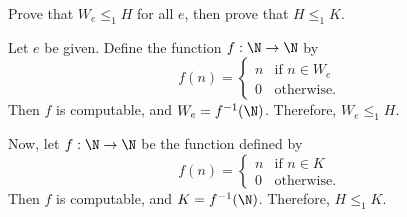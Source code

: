 \begin{problem}
  Prove that $W_e \leq_1 H$ for all $e$,
  then prove that $H \leq_1 K$.

  \begin{answer}
    Let $e$ be given.
    Define the function $f : \N \to \N$ by
    \[
      f(n) = \begin{cases}
        n & \text{if $n \in W_e$} \\
        0 & \text{otherwise}.
      \end{cases}
    \]
    Then $f$ is computable, and $W_e = f^{-1}(\N)$.
    Therefore, $W_e \leq_1 H$.

    Now, let $f : \N \to \N$ be the function defined by
    \[
      f(n) = \begin{cases}
        n & \text{if $n \in K$} \\
        0 & \text{otherwise}.
      \end{cases}
    \]
    Then $f$ is computable, and $K = f^{-1}(\N)$.
    Therefore, $H \leq_1 K$.
  \end{answer}
\end{problem}
